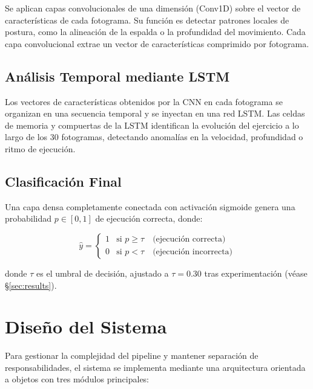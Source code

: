 \documentclass[conference]{IEEEtran}
\begin{document}
Se aplican capas convolucionales de una dimensión (Conv1D) sobre
el vector de características de cada fotograma. Su función es
detectar patrones locales de postura, como la alineación de la
espalda o la profundidad del movimiento. Cada capa convolucional
extrae un vector de características comprimido por fotograma.

\subsection{Análisis Temporal mediante LSTM}

Los vectores de características obtenidos por la CNN en cada
fotograma se organizan en una secuencia temporal y se inyectan
en una red LSTM. Las celdas de memoria y compuertas de la LSTM
identifican la evolución del ejercicio a lo largo de los 30
fotogramas, detectando anomalías en la velocidad, profundidad
o ritmo de ejecución.

\subsection{Clasificación Final}

Una capa densa completamente conectada con activación sigmoide
genera una probabilidad $p \in [0, 1]$ de ejecución correcta,
donde:

\begin{equation}
  \hat{y} =
  \begin{cases}
    1 & \text{si } p \geq \tau \quad \text{(ejecución correcta)} \\
    0 & \text{si } p < \tau  \quad \text{(ejecución incorrecta)}
  \end{cases}
  \label{eq:decision}
\end{equation}

donde $\tau$ es el umbral de decisión, ajustado a $\tau = 0.30$
tras experimentación (véase §\ref{sec:results}).

\section{Diseño del Sistema}
\label{sec:design}

Para gestionar la complejidad del pipeline y mantener separación
de responsabilidades, el sistema se implementa mediante una
arquitectura orientada a objetos con tres módulos principales:
\end{document}

